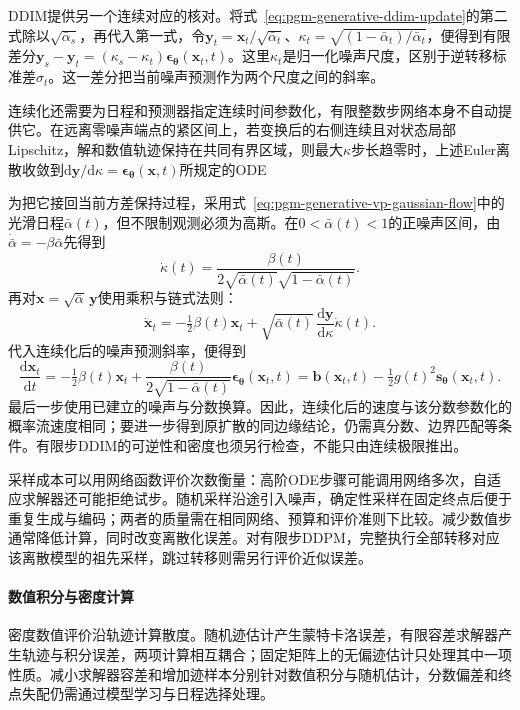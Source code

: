 DDIM提供另一个连续对应的核对。将式~\eqref{eq:pgm-generative-ddim-update}的第二式除以$\sqrt{\bar\alpha_s}$，再代入第一式，令$\bm y_t=\bm x_t/\sqrt{\bar\alpha_t}$、$\kappa_t=\sqrt{(1-\bar\alpha_t)/\bar\alpha_t}$，便得到有限差分$\bm y_s-\bm y_t=(\kappa_s-\kappa_t)\bm\epsilon_{\bm\theta}(\bm x_t,t)$。这里$\kappa_t$是归一化噪声尺度，区别于逆转移标准差$\sigma_t$。这一差分把当前噪声预测作为两个尺度之间的斜率。

连续化还需要为日程和预测器指定连续时间参数化，有限整数步网络本身不自动提供它。在远离零噪声端点的紧区间上，若变换后的右侧连续且对状态局部Lipschitz，解和数值轨迹保持在共同有界区域，则最大$\kappa$步长趋零时，上述Euler离散收敛到$\mathrm d\bm y/\mathrm d\kappa=\bm\epsilon_{\bm\theta}(\bm x,t)$所规定的ODE

为把它接回当前方差保持过程，采用式~\eqref{eq:pgm-generative-vp-gaussian-flow}中的光滑日程$\bar\alpha(t)$，但不限制观测必须为高斯。在$0<\bar\alpha(t)<1$的正噪声区间，由$\dot{\bar\alpha}=-\beta\bar\alpha$先得到
\[
 \dot\kappa(t)
   =\frac{\beta(t)}{2\sqrt{\bar\alpha(t)}\sqrt{1-\bar\alpha(t)}}.
\]
再对$\bm x=\sqrt{\bar\alpha}\,\bm y$使用乘积与链式法则：
\[
 \dot{\bm x}_t=-\tfrac12\beta(t)\bm x_t
        +\sqrt{\bar\alpha(t)}\,
          \frac{\mathrm d\bm y}{\mathrm d\kappa}\dot\kappa(t).
\]
代入连续化后的噪声预测斜率，便得到
\[
  \frac{\mathrm d\bm x_t}{\mathrm dt}
   =-\tfrac12\beta(t)\bm x_t+
      \frac{\beta(t)}{2\sqrt{1-\bar\alpha(t)}}
                    \bm\epsilon_{\bm\theta}(\bm x_t,t)
   =\bm b(\bm x_t,t)-\tfrac12g(t)^2
                    \bm s_{\bm\theta}(\bm x_t,t).
\]
最后一步使用已建立的噪声与分数换算。因此，连续化后的速度与该分数参数化的概率流速度相同；要进一步得到原扩散的同边缘结论，仍需真分数、边界匹配等条件。有限步DDIM的可逆性和密度也须另行检查，不能只由连续极限推出。

采样成本可以用网络函数评价次数衡量：高阶ODE步骤可能调用网络多次，自适应求解器还可能拒绝试步。随机采样沿途引入噪声，确定性采样在固定终点后便于重复生成与编码；两者的质量需在相同网络、预算和评价准则下比较。减少数值步通常降低计算，同时改变离散化误差。对有限步DDPM，完整执行全部转移对应该离散模型的祖先采样，跳过转移则需另行评价近似误差。

\paragraph{数值积分与密度计算}

密度数值评价沿轨迹计算散度。随机迹估计产生蒙特卡洛误差，有限容差求解器产生轨迹与积分误差，两项计算相互耦合；固定矩阵上的无偏迹估计只处理其中一项性质。减小求解器容差和增加迹样本分别针对数值积分与随机估计，分数偏差和终点失配仍需通过模型学习与日程选择处理。

